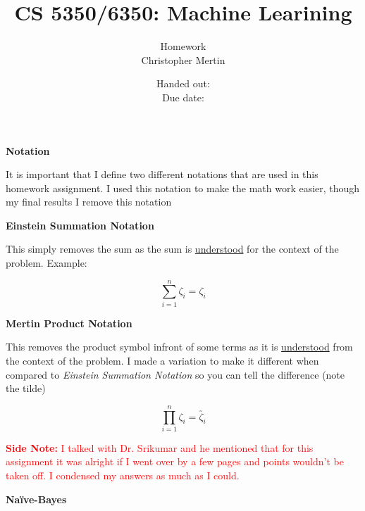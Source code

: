 \documentclass[12pt, fullpage,letterpaper]{article}
\title{CS 5350/6350: Machine Learining \semester}
\author{Homework \assignmentId\\Christopher Mertin}
\date{Handed out: \releaseDate\\
  Due date: \dueDate}
\begin{document}
\maketitle
{\large\bf Notation}

It is important that I define two different notations that are used in this homework assignment. I used this notation to make the math work easier, though my final results I remove this notation

{\bf Einstein Summation Notation}

This simply removes the sum as the sum is \underline{understood} for the context of the problem. Example:

\[
\sum_{i=1}^{n} \zeta_{i} = \zeta_{i}
\]

{\bf Mertin Product Notation}

This removes the product symbol infront of some terms as it is \underline{understood} from the context of the problem. I made a variation to make it different when compared to {\em Einstein Summation Notation} so you can tell the difference (note the tilde)

\[
\prod_{i=1}^{n}\zeta_{i} = \utilde{\zeta_{i}}
\]

\textcolor{red}{{\bf Side Note:} I talked with Dr. Srikumar and he mentioned that for this assignment it was alright if I went over by a few pages and points wouldn't be taken off. I condensed my answers as much as I could.}

{\large \bf Na\"{i}ve-Bayes}
\end{document}
